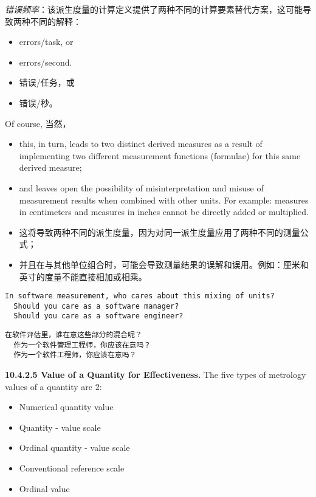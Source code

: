 \textit{错误频率}：该派生度量的计算定义提供了两种不同的计算要素替代方案，这可能导致两种不同的解释：

\begin{itemize}
 \item errors/task, or 
 \item errors/second.
\end{itemize}

\begin{itemize}
  \item 错误/任务，或
  \item 错误/秒。
\end{itemize}

Of course,
当然，

\begin{itemize}
 \item this, in turn, leads to two distinct derived measures as a result of implementing two different measurement functions (formulae) for this same derived 
measure; 
 \item and leaves open the possibility of misinterpretation and misuse of measurement results when combined with other units. For example: measures 
in centimeters and measures in inches cannot be directly added or 
multiplied.
\end{itemize}

\begin{itemize}
\item 这将导致两种不同的派生度量，因为对同一派生度量应用了两种不同的测量公式；
\item 并且在与其他单位组合时，可能会导致测量结果的误解和误用。例如：厘米和英寸的度量不能直接相加或相乘。
\end{itemize}

\begin{lstlisting}
In software measurement, who cares about this mixing of units? 
  Should you care as a software manager? 
  Should you care as a software engineer?
\end{lstlisting}

\begin{lstlisting}
在软件评估里，谁在意这些部分的混合呢？
  作为一个软件管理工程师，你应该在意吗？
  作为一个软件工程师，你应该在意吗？
\end{lstlisting}

\textbf{10.4.2.5 Value of a Quantity for Effectiveness.} The five types of metrology values of a quantity are 2:

\begin{itemize}
 \item Numerical quantity value 
 \item Quantity - value scale 
 \item Ordinal quantity - value scale 
 \item Conventional reference scale 
 \item Ordinal value
\end{itemize}


